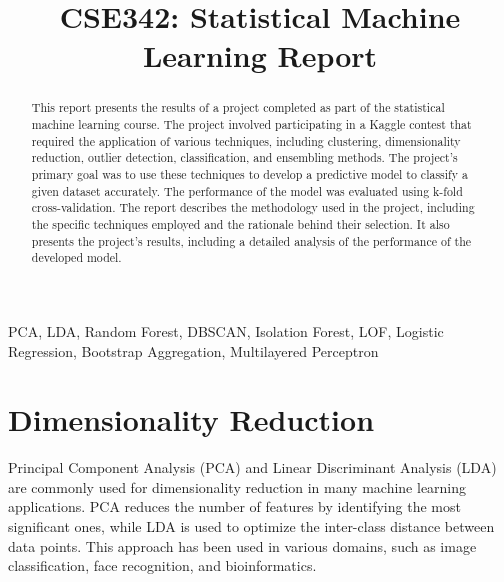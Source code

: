 \documentclass[conference]{IEEEtran}
\begin{document}
\title{CSE342: Statistical Machine Learning Report}

\author{
\and
{}
}

\maketitle

\begin{abstract}
This report presents the results of a project completed as part of the statistical machine learning course. The project involved participating in a Kaggle contest that required the application of various techniques, including clustering, dimensionality reduction, outlier detection, classification, and ensembling methods. The project's primary goal was to use these techniques to develop a predictive model to classify a given dataset accurately. The performance of the model was evaluated using k-fold cross-validation. The report describes the methodology used in the project, including the specific techniques employed and the rationale behind their selection. It also presents the project's results, including a detailed analysis of the performance of the developed model.
\end{abstract}

\begin{IEEEkeywords}
PCA, LDA, Random Forest, DBSCAN, Isolation Forest, LOF, Logistic Regression, Bootstrap Aggregation, Multilayered Perceptron
\end{IEEEkeywords}

\section{Dimensionality Reduction}

Principal Component Analysis (PCA) and Linear Discriminant Analysis (LDA) are commonly used for dimensionality reduction in many machine learning applications. PCA reduces the number of features by identifying the most significant ones, while LDA is used to optimize the inter-class distance between data points. This approach has been used in various domains, such as image classification, face recognition, and bioinformatics.
\end{document}
